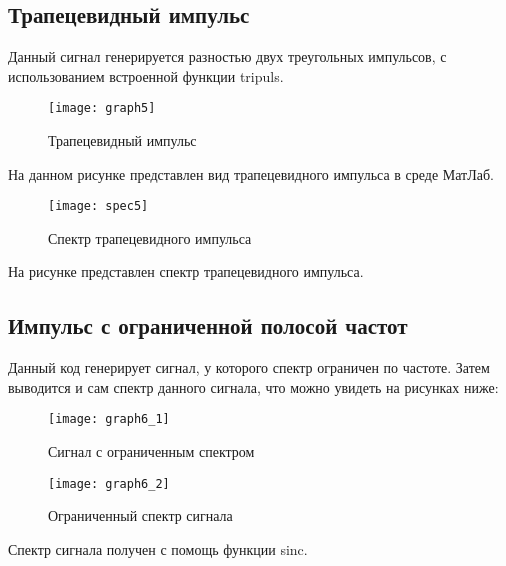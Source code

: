 \subsection{Трапецевидный импульс}


\parindent=1cm
Данный сигнал генерируется разностью двух треугольных импульсов, с использованием встроенной функции tripuls.

\begin{figure}[H]
	\begin{center}
		\texttt{[image: graph5]}
		\caption{Трапецевидный импульс} 
		\label{pic:graph5} %
	\end{center}
\end{figure}
На данном рисунке представлен вид трапецевидного импульса в среде МатЛаб.

\begin{figure}[H]
	\begin{center}
		\texttt{[image: spec5]}
		\caption{Спектр трапецевидного импульса} 
		\label{pic:spec5} %
	\end{center}
\end{figure}
На рисунке представлен спектр трапецевидного импульса.

\subsection{Импульс с ограниченной полосой частот}


\parindent=1cm
Данный код генерирует сигнал, у которого спектр ограничен по частоте. Затем выводится и сам спектр данного сигнала, что можно увидеть на рисунках ниже:

\begin{figure}[H]
	\begin{center}
		\texttt{[image: graph6\_1]}
		\caption{Сигнал с ограниченным спектром} 
		\label{pic:graph6_1} %
	\end{center}
\end{figure}
\begin{figure}[H]
	\begin{center}
		\texttt{[image: graph6\_2]}
		\caption{Ограниченный спектр сигнала} 
		\label{pic:graph6_2} %
	\end{center}
\end{figure}
Спектр сигнала получен с помощь функции sinc.

